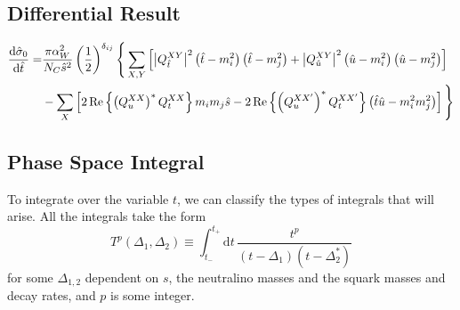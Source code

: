 \documentclass[../main.tex]{subfiles}
\begin{document}
        \subsection{Differential Result}
            \begin{align}
                \nonumber
                \d[\hat{t}]{\hat{\sigma}_0} = & \frac{\pi \alpha_W^2}{N_C \hat{s}^2} \pclosed{\frac{1}{2}}^{\delta_{ij}} \Bigg\{ \sum_{X,Y} \bclosed{\abs{Q^{XY}_{\hat{t}}}^2 \pclosed{\hat{t}-m_i^2}\pclosed{\hat{t}-m_j^2} + \abs{Q^{XY}_{\hat{u}}}^2 \pclosed{\hat{u}-m_i^2}\pclosed{\hat{u}-m_j^2}} \\
                                              & - \sum_X \bclosed{2\Re{\pclosed{Q_{u}^{XX}}^\ast Q_{t}^{XX}} m_i m_j \hat{s} - 2\Re{\pclosed{Q_{u}^{XX^\prime}}^\ast Q_{t}^{XX^\prime}} \pclosed{\hat{t}\hat{u} - m_i^2m_j^2}} \Bigg\}
            \end{align}

        \subsection{Phase Space Integral}
            To integrate over the variable \(t\), we can classify the types of integrals that will arise.
            All the integrals take the form
            \begin{equation}
                T^p(\Delta_1, \Delta_2) \equiv \int_{t_-}^{t_+} \!\mathrm{d}t\, \frac{t^p}{(t-\Delta_1)(t-\Delta_2^\ast)}
            \end{equation}
            for some \(\Delta_{1,2}\) dependent on \(s\), the neutralino masses and the squark masses and decay rates, and \(p\) is some integer.
\end{document}
